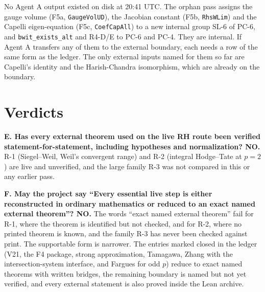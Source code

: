 \documentclass[11pt]{article}
\newcommand{\lean}[1]{\nolinkurl{#1}}
\theoremstyle{definition}
\begin{document}
No Agent A output existed on disk at 20:41 UTC. The orphan pass assigns the gauge volume (F5a, \lean{GaugeVolUD}), the Jacobian constant (F5b, \lean{RhsWLim}) and the Capelli eigen-equation (F5c, \lean{CoefCapAll}) to a new internal group SL-6 of PC-6, and \lean{bwit_exists_alt} and R4-D/E to PC-6 and PC-4. They are internal. If Agent A transfers any of them to the external boundary, each needs a row of the same form as the ledger. The only external inputs named for them so far are Capelli's identity and the Harish-Chandra isomorphism, which are already on the boundary.

\section{Verdicts}

\textbf{E. Has every external theorem used on the live RH route been verified statement-for-statement, including hypotheses and normalization? NO.} R-1 (Siegel--Weil, Weil's convergent range) and R-2 (integral Hodge--Tate at $p=2$) are live and unverified, and the large family R-3 was not compared in this or any earlier pass.

\textbf{F. May the project say ``Every essential live step is either reconstructed in ordinary mathematics or reduced to an exact named external theorem''? NO.} The words ``exact named external theorem'' fail for R-1, where the theorem is identified but not checked, and for R-2, where no printed theorem is known, and the family R-3 has never been checked against print. The supportable form is narrower. The entries marked closed in the ledger (V21, the F4 package, strong approximation, Tamagawa, Zhang with the intersection-system interface, and Fargues for odd $p$) reduce to exact named theorems with written bridges, the remaining boundary is named but not yet verified, and every external statement is also proved inside the Lean archive.
\end{document}
